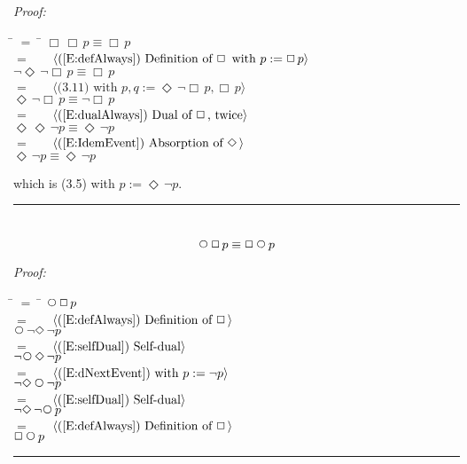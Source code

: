 \documentclass[fleqn, leqno]{article}
\newcommand{\lgap}{2pt}                             %
\newcommand{\mymathindent}{24pt}                    %
\newcommand{\Next}{\;\,\text{\raisebox{3.5pt}{\circle{6}}}}
\newcommand{\Event}{\Diamond\,}
\newcommand{\Always}{\Box\,}
\newcommand{\myqed}{\hfill\rule[-.23ex]{1.2ex}{2.0ex}}
\newcommand{\Gll} {\langle}                         %
\newcommand{\Ggg} {\rangle}                         %
\newcommand{\Hint}[1]     {\ \ \ $\Gll              \mbox{#1} \Ggg$ }   %
\begin{document}
\emph{Proof:}
\begin{tabbing}
\hspace{\mymathindent} \= $= \;$ \= \kill
  \> \>   $\Always\Always p \equiv \Always p$\\[\lgap]
  \> $=$  \>  \Hint{(\ref{E:defAlways}) Definition of $\Always$ with $p := \Always p$}\\[\lgap]
  \> \>   $\lnot\Event\lnot\Always p \equiv \Always p$\\[\lgap]
  \> $=$  \>  \Hint{(3.11) with $p,q := \Event\lnot\Always p, \Always p$}\\[\lgap]
  \> \>   $\Event\lnot\Always p \equiv \lnot\Always p$\\[\lgap]
  \> $=$  \>  \Hint{(\ref{E:dualAlways}) Dual of $\Always$, twice}\\[\lgap]
  \> \>   $\Event\Event\lnot p \equiv \Event\lnot p$\\[\lgap]
  \> $=$  \>  \Hint{(\ref{E:IdemEvent}) Absorption of $\Event$}\\[\lgap]
  \> \>   $\Event\lnot p \equiv \Event\lnot p$\\[\lgap]
\end{tabbing}
which is (3.5) with $p := \Event\lnot p$. \myqed\\[\lgap]


\begin{equation}\label{E:dNextAlways}
\Next\Always p \equiv \Always\Next p
\end{equation}

\emph{Proof:}
\begin{tabbing}
\hspace{\mymathindent} \= $= \;$ \= \kill
  \> \>   $\Next\Always p$\\[\lgap]
  \> $=$  \>  \Hint{(\ref{E:defAlways}) Definition of $\Always$}\\[\lgap]
  \> \>   $\Next\lnot\Event\lnot p$\\[\lgap]
  \> $=$  \>  \Hint{(\ref{E:selfDual}) Self-dual}\\[\lgap]
  \> \>   $\lnot\Next\Event\lnot p$\\[\lgap]
  \> $=$  \>  \Hint{(\ref{E:dNextEvent}) with $p := \lnot p$}\\[\lgap]
  \> \>   $\lnot\Event\Next\lnot p$\\[\lgap]
  \> $=$  \>  \Hint{(\ref{E:selfDual}) Self-dual}\\[\lgap]
  \> \>   $\lnot\Event\lnot\Next p$\\[\lgap]
  \> $=$  \>  \Hint{(\ref{E:defAlways}) Definition of $\Always$}\\[\lgap]
  \> \>   $\Always\Next p$\\[\lgap]
\end{tabbing}
\myqed\\[\lgap]
\end{document}
